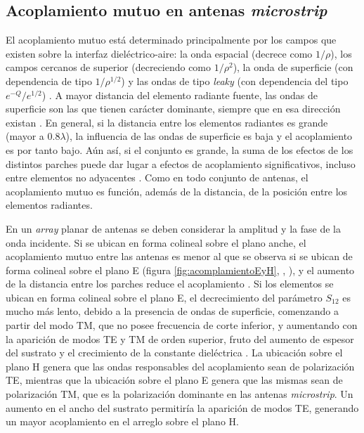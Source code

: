 \subsection{Acoplamiento mutuo en antenas \textit{microstrip}}
\label{subsec_acoplamiento_microstrip}
El acoplamiento mutuo está determinado principalmente por los campos que existen sobre la interfaz dieléctrico-aire: la onda espacial (decrece como $1/\rho$), los campos cercanos de superior (decreciendo como $1/\rho^2$), la onda de superficie (con dependencia de tipo $1/\rho^{1/2}$) y las ondas de tipo \textit{leaky} (con dependencia del tipo $e^{-Q}/e^{1/2}$) \cite{Balanis:Advanced}. A mayor distancia del elemento radiante fuente, las ondas de superficie son las que tienen carácter dominante, siempre que en esa dirección existan \cite{Alexopoulos:PrintedDipoles}. En general, si la distancia entre los elementos radiantes es grande (mayor a $0.8 \lambda$), la influencia de las ondas de superficie es baja y el acoplamiento es por tanto bajo. Aún así, si el conjunto es grande, la suma de los efectos de los distintos parches puede dar lugar a efectos de acoplamiento significativos, incluso entre elementos no adyacentes \cite{Dodov:SurfaceWavesImpact}. Como en todo conjunto de antenas, el acoplamiento mutuo es función, además de la distancia, de la posición entre los elementos radiantes.

En un \textit{array} planar de antenas se deben considerar la amplitud y la fase de la onda incidente. Si se ubican en forma colineal sobre el plano anche, el acoplamiento mutuo entre las antenas es menor al que se observa si se ubican de forma colineal sobre el plano E (figura \ref{fig:acomplamientoEyH}, \cite{VanLil:TLModelCoupling}, \cite{Pozar:InputImpedanceMutualCoupling}), y el aumento de la distancia entre los parches reduce el acoplamiento \cite{Dodov:SurfaceWavesImpact}. Si los elementos se ubican en forma colineal sobre el plano E, el decrecimiento del parámetro $S_{12}$ es mucho más lento, debido a la presencia de ondas de superficie, comenzando a partir del modo TM, que no posee frecuencia de corte inferior, y aumentando con la aparición de modos TE y TM de orden superior, fruto del aumento de espesor del sustrato y el crecimiento de la constante dieléctrica \cite{Alexopoulos:PrintedDipoles}. La ubicación sobre el plano H genera que las ondas responsables del acoplamiento sean de polarización TE, mientras que la ubicación sobre el plano E genera que las mismas sean de polarización TM, que es la polarización dominante en las antenas \textit{microstrip}. Un aumento en el ancho del sustrato permitiría la aparición de modos TE, generando un mayor acoplamiento en el arreglo sobre el plano H.

